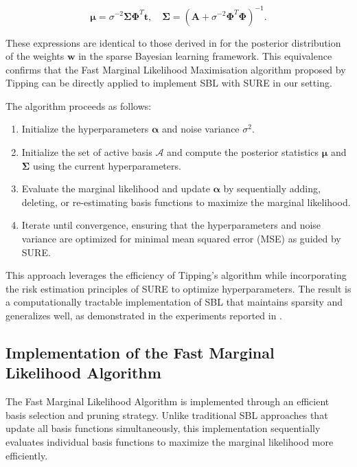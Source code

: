\documentclass{article}
\begin{document}
\begin{equation}
    \boldsymbol{\mu} = \sigma^{-2}\boldsymbol{\Sigma}\boldsymbol{\Phi}^T\mathbf{t}, \quad \boldsymbol{\Sigma} = \left(\mathbf{A} + \sigma^{-2}\boldsymbol{\Phi}^T\boldsymbol{\Phi}\right)^{-1}.
\end{equation}

These expressions are identical to those derived in \citet{tipp2003fastsb} for the posterior distribution of the weights $\mathbf{w}$ in the sparse Bayesian learning framework. This equivalence confirms that the Fast Marginal Likelihood Maximisation algorithm proposed by Tipping can be directly applied to implement SBL with SURE in our setting.

The algorithm proceeds as follows:
\begin{enumerate}
    \item Initialize the hyperparameters $\boldsymbol{\alpha}$ and noise variance $\sigma^2$.
    \item Initialize the set of active basis $\mathcal{A}$ and compute the posterior statistics $\boldsymbol{\mu}$ and $\boldsymbol{\Sigma}$ using the current hyperparameters.
    \item Evaluate the marginal likelihood and update $\boldsymbol{\alpha}$ by sequentially adding, deleting, or re-estimating basis functions to maximize the marginal likelihood.
    \item Iterate until convergence, ensuring that the hyperparameters and noise variance are optimized for minimal mean squared error (MSE) as guided by SURE.
\end{enumerate}

This approach leverages the efficiency of Tipping's algorithm while incorporating the risk estimation principles of SURE to optimize hyperparameters. The result is a computationally tractable implementation of SBL that maintains sparsity and generalizes well, as demonstrated in the experiments reported in \citet{tipp2003fastsb}.

\subsection{Implementation of the Fast Marginal Likelihood Algorithm}

The Fast Marginal Likelihood Algorithm is implemented through an efficient basis selection and pruning strategy. Unlike traditional SBL approaches that update all basis functions simultaneously, this implementation sequentially evaluates individual basis functions to maximize the marginal likelihood more efficiently.
\end{document}
